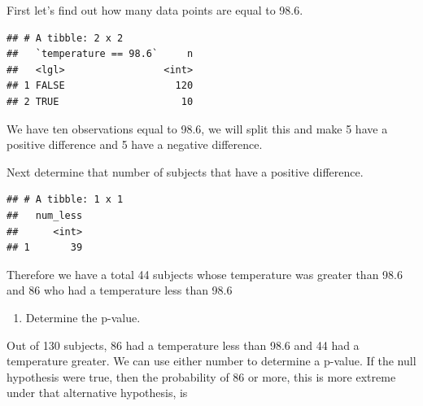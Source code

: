 \documentclass[
]{book}
\newenvironment{Shaded}{\begin{snugshade}}{\end{snugshade}}
\newcommand{\DataTypeTok}[1]{\textcolor[rgb]{0.13,0.29,0.53}{#1}}
\newcommand{\DecValTok}[1]{\textcolor[rgb]{0.00,0.00,0.81}{#1}}
\newcommand{\FloatTok}[1]{\textcolor[rgb]{0.00,0.00,0.81}{#1}}
\newcommand{\KeywordTok}[1]{\textcolor[rgb]{0.13,0.29,0.53}{\textbf{#1}}}
\newcommand{\NormalTok}[1]{#1}
\newcommand{\OperatorTok}[1]{\textcolor[rgb]{0.81,0.36,0.00}{\textbf{#1}}}
\newcommand{\StringTok}[1]{\textcolor[rgb]{0.31,0.60,0.02}{#1}}
\providecommand{\tightlist}{%
  \setlength{\itemsep}{0pt}\setlength{\parskip}{0pt}}
\begin{document}
First let's find out how many data points are equal to 98.6.

\begin{Shaded}
\end{Shaded}

\begin{verbatim}
## # A tibble: 2 x 2
##   `temperature == 98.6`     n
##   <lgl>                 <int>
## 1 FALSE                   120
## 2 TRUE                     10
\end{verbatim}

We have ten observations equal to 98.6, we will split this and make 5 have a positive difference and 5 have a negative difference.

Next determine that number of subjects that have a positive difference.

\begin{Shaded}
\end{Shaded}

\begin{verbatim}
## # A tibble: 1 x 1
##   num_less
##      <int>
## 1       39
\end{verbatim}

Therefore we have a total 44 subjects whose temperature was greater than 98.6 and 86 who had a temperature less than 98.6

\begin{enumerate}
\def\labelenumi{\alph{enumi}.}
\setcounter{enumi}{4}
\tightlist
\item
  Determine the p-value.
\end{enumerate}

Out of 130 subjects, 86 had a temperature less than 98.6 and 44 had a temperature greater. We can use either number to determine a p-value. If the null hypothesis were true, then the probability of 86 or more, this is more extreme under that alternative hypothesis, is
\end{document}
